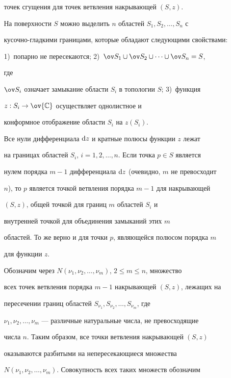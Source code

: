 \begin{pf}
точек сгущения для точек ветвления накрывающей $(S,z)$.





На поверхности $S$ можно выделить $n$ областей $S_1,S_2,\dotsc,S_n$ с


кусочно-гладкими границами, которые обладают следующими свойствами:


1)~попарно не пересекаются; 2)~$\ov S_1\cup\ov S_2\cup\dotsb\cup\ov S_n=S$,


где


$\ov S_i$ означает замыкание области $S_i$ в топологии $S$; 3)~функция


$z: S_i\to \ov{\Bbb C}$ осуществляет однолистное и


конформное отображение области $S_i$ на $z(S_i)$.





Все нули дифференциала $\mathrm d z$ и кратные полюсы функции $z$ лежат


на границах областей $S_i$, $i=1, 2,\dotsc,n$. Если точка $p\in S$ является


нулем порядка $m-1$ дифференциала $\mathrm d z$ (очевидно, $m$ не превосходит


$n$), то $p$ является точкой ветвления порядка $m-1$ для накрывающей


$(S,z)$, общей точкой для границ $m$ областей $S_i$ и


внутренней точкой для объединения замыканий этих $m$


областей. То же верно и для точки $p$, являющейся полюсом порядка $m$


для функции $z$.





Обозначим через $N(\nu_1, \nu_2,\dotsc,\nu_m)$, $2\le m\le n$, множество


всех точек ветвления порядка $m-1$ накрывающей $(S,z)$, лежащих на


пересечении границ областей $S_{\nu_1},S_{\nu_2},\dotsc,S_{\nu_m}$, где


$\nu_1, \nu_2,\dotsc,\nu_m$ --- различные натуральные числа, не превосходящие


числа $n$. Таким образом, все точки ветвления накрывающей $(S,z)$


оказываются разбитыми на непересекающиеся множества


$N(\nu_1, \nu_2,\dotsc,\nu_m)$. Совокупность всех таких множеств обозначим



\end{pf}
